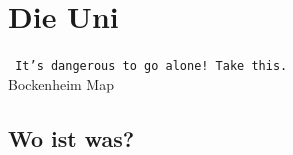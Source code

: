 \documentclass[12pt,a4paper]{scrartcl}
\begin{document}

	
\newpage
\section{Die Uni}
			\begin{center}
			\texttt{ It's dangerous to go alone! Take this. }
            \\Bockenheim Map
			\end{center}
		\pagebreak
	\subsection{Wo ist was?}
    
		
	\newpage
\end{document}

